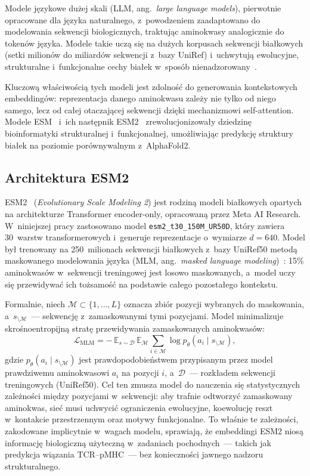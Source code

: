 \documentclass{SGGW-thesis}
\begin{document}
Modele językowe dużej skali (LLM, ang.\ \textit{large language models}), pierwotnie opracowane dla
języka naturalnego, z~powodzeniem zaadaptowano do modelowania sekwencji biologicznych, traktując
aminokwasy analogicznie do tokenów języka. Modele takie uczą się na dużych korpusach sekwencji
białkowych (setki milionów do miliardów sekwencji z~bazy UniRef) i~uchwytują ewolucyjne, strukturalne
i~funkcjonalne cechy białek w~sposób nienadzorowany~\cite{rives2021}.

Kluczową właściwością tych modeli jest zdolność do generowania kontekstowych embeddingów: reprezentacja
danego aminokwasu zależy nie tylko od niego samego, lecz od całej otaczającej sekwencji dzięki
mechanizmowi self-attention. Modele ESM~\cite{rives2021} i~ich następnik ESM2~\cite{lin2023}
zrewolucjonizowały dziedzinę bioinformatyki strukturalnej i~funkcjonalnej, umożliwiając predykcję
struktury białek na poziomie porównywalnym z~AlphaFold2.

\subsection{Architektura ESM2}

ESM2~\cite{lin2023} (\textit{Evolutionary Scale Modeling 2}) jest rodziną modeli białkowych opartych
na architekturze Transformer encoder-only, opracowaną przez Meta AI Research. W~niniejszej pracy
zastosowano model \texttt{esm2\_t30\_150M\_UR50D}, który zawiera 30~warstw transformerowych
i~generuje reprezentacje o~wymiarze $d = 640$. Model był trenowany na 250~milionach sekwencji
białkowych z~bazy UniRef50 metodą maskowanego modelowania języka (MLM, ang.\ \textit{masked language
modeling})~\cite{devlin2019}: 15\% aminokwasów w~sekwencji treningowej jest losowo maskowanych,
a~model uczy się przewidywać ich tożsamość na podstawie całego pozostałego kontekstu.

Formalnie, niech $\mathcal{M} \subset \{1, \ldots, L\}$ oznacza zbiór pozycji wybranych do
maskowania, a~$s_{\setminus \mathcal{M}}$~--- sekwencję z~zamaskowanymi tymi pozycjami. Model
minimalizuje skrośnoentropijną stratę przewidywania zamaskowanych aminokwasów:
\begin{equation}
    \mathcal{L}_{\mathrm{MLM}} = -\,\mathbb{E}_{s \sim \mathcal{D}}\,
    \mathbb{E}_{\mathcal{M}} \sum_{i \in \mathcal{M}} \log p_\theta\!\left(a_i \mid s_{\setminus \mathcal{M}}\right),
    \label{eq:mlm}
\end{equation}
gdzie $p_\theta(a_i \mid s_{\setminus \mathcal{M}})$ jest prawdopodobieństwem przypisanym przez model
prawdziwemu aminokwasowi $a_i$ na pozycji $i$, a~$\mathcal{D}$~--- rozkładem sekwencji treningowych
(UniRef50). Cel ten zmusza model do nauczenia się statystycznych zależności między pozycjami
w~sekwencji: aby trafnie odtworzyć zamaskowany aminokwas, sieć musi uchwycić ograniczenia
ewolucyjne, koewolucję reszt w~kontakcie przestrzennym oraz motywy funkcjonalne. To właśnie te
zależności, zakodowane implicytnie w~wagach modelu, sprawiają, że embeddingi ESM2 niosą informację
biologiczną użyteczną w~zadaniach pochodnych~--- takich jak predykcja wiązania TCR--pMHC~--- bez
konieczności jawnego nadzoru strukturalnego.
\end{document}
